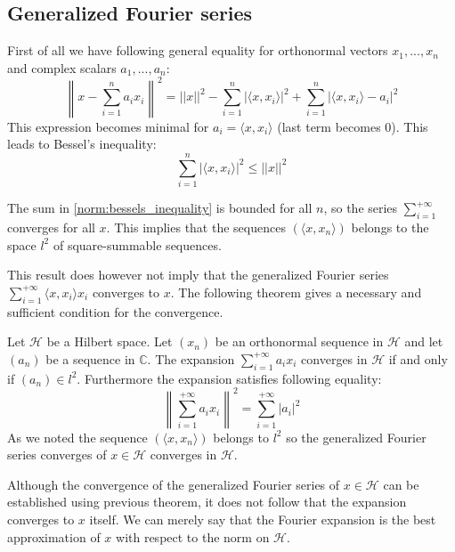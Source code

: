 \subsection{Generalized Fourier series}

	\begin{property}
		First of all we have following general equality for orthonormal vectors $x_1, ..., x_n$ and complex scalars $a_1, ..., a_n$:
		\begin{equation}
			\left\lVert x - \sum_{i=1}^n a_ix_i\right\rVert^2 = ||x||^2 - \sum_{i=1}^n|\langle x, x_i\rangle|^2 + \sum_{i=1}^n|\langle x, x_i\rangle - a_i|^2
		\end{equation}
		This expression becomes minimal for $a_i = \langle x, x_i\rangle$ (last term becomes 0). This leads to Bessel's inequality:
		\begin{equation}
			\label{norm:bessels_inequality}
			\boxed{\sum_{i=1}^n|\langle x, x_i\rangle|^2 \leq ||x||^2}
		\end{equation}
	\end{property}
	\begin{result}
		The sum in \ref{norm:bessels_inequality} is bounded for all $n$, so the series $\sum_{i=1}^{+\infty}$ converges for all $x$. This implies that the sequences $(\langle x, x_n\rangle)$ belongs to the space $l^2$ of square-summable sequences.
	\end{result}
	
	This result does however not imply that the generalized Fourier series $\sum_{i=1}^{+\infty}\langle x, x_i\rangle x_i$ converges to $x$. The following theorem gives a necessary and sufficient condition for the convergence.
	\begin{theorem}
		Let $\mathcal{H}$ be a Hilbert space. Let $(x_n)$ be an orthonormal sequence in $\mathcal{H}$ and let $(a_n)$ be a sequence in $\mathbb{C}$. The expansion $\sum_{i=1}^{+\infty}a_ix_i$ converges in $\mathcal{H}$ if and only if $(a_n)\in l^2$. Furthermore the expansion satisfies following equality:
		\begin{equation}
			\left\lVert\sum_{i=1}^{+\infty}a_ix_i\right\rVert^2 = \sum_{i=1}^{+\infty}|a_i|^2
		\end{equation}
		As we noted the sequence $(\langle x, x_n\rangle)$ belongs to $l^2$ so the generalized Fourier series converges of $x\in\mathcal{H}$ converges in $\mathcal{H}$.
	\end{theorem}
	\begin{remark}
		Although the convergence of the generalized Fourier series of $x\in\mathcal{H}$ can be established using previous theorem, it does not follow that the expansion converges to $x$ itself. We can merely say that the Fourier expansion is the best approximation of $x$ with respect to the norm on $\mathcal{H}$.
	\end{remark}
    
